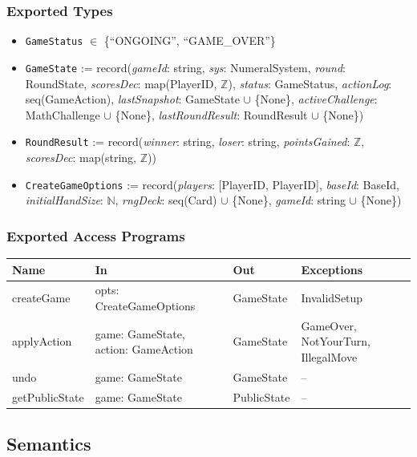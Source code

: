 \documentclass[12pt, titlepage]{article}
\begin{document}
\subsubsection{Exported Types}
\begin{itemize}
    \item \texttt{GameStatus} $\in$ \{``ONGOING'', ``GAME\_OVER''\}
    \item \texttt{GameState} := record(\textit{gameId}: string, \textit{sys}: NumeralSystem, \textit{round}: RoundState, \textit{scoresDec}: map(PlayerID, $\mathbb{Z}$), \textit{status}: GameStatus, \textit{actionLog}: seq(GameAction), \textit{lastSnapshot}: GameState $\cup$ \{None\}, \textit{activeChallenge}: MathChallenge $\cup$ \{None\}, \textit{lastRoundResult}: RoundResult $\cup$ \{None\})
    \item \texttt{RoundResult} := record(\textit{winner}: string, \textit{loser}: string, \textit{pointsGained}: $\mathbb{Z}$, \textit{scoresDec}: map(string, $\mathbb{Z}$))
    \item \texttt{CreateGameOptions} := record(\textit{players}: [PlayerID, PlayerID], \textit{baseId}: BaseId, \textit{initialHandSize}: $\mathbb{N}$, \textit{rngDeck}: seq(Card) $\cup$ \{None\}, \textit{gameId}: string $\cup$ \{None\})
\end{itemize}

\subsubsection{Exported Access Programs}

\begin{center}
    \begin{tabular}{p{3.5cm} p{5cm} p{3.0cm} p{3.5cm}}
        \toprule
        \textbf{Name} & \textbf{In} & \textbf{Out} & \textbf{Exceptions} \\
        \midrule
        createGame & opts: CreateGameOptions & GameState & InvalidSetup \\
        applyAction & game: GameState, action: GameAction & GameState & GameOver, NotYourTurn, IllegalMove \\
        undo & game: GameState & GameState & -- \\
        getPublicState & game: GameState & PublicState & -- \\
        \bottomrule
    \end{tabular}
\end{center}

\subsection{Semantics}
\end{document}
